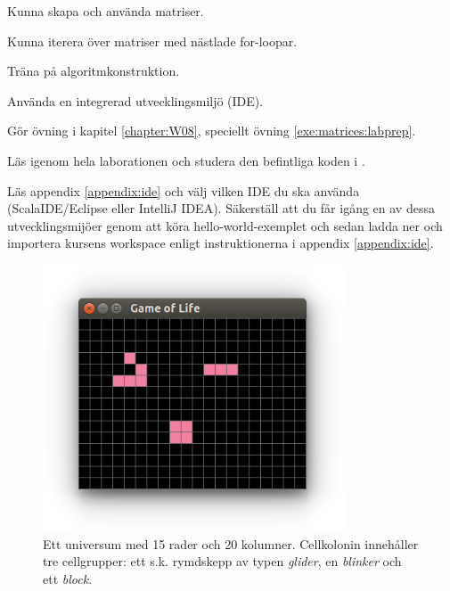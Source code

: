 
\Lab{\LabWeekEIGHT}

\begin{Goals}
\item Kunna skapa och använda matriser.
\item Kunna iterera över matriser med nästlade for-loopar.
\item Träna på algoritmkonstruktion.
\item Använda en integrerad utvecklingsmiljö (IDE).
\end{Goals}

\begin{Preparations}
\item Gör övning {\tt \ExeWeekEIGHT} i kapitel \ref{chapter:W08}, speciellt övning \ref{exe:matrices:labprep}.

\item Läs igenom hela laborationen och studera den befintliga koden i \TODO {}.

\item Läs appendix \ref{appendix:ide} och välj vilken IDE du ska använda (ScalaIDE/Eclipse eller IntelliJ IDEA). Säkerställ att du får igång en av dessa utvecklingsmijöer genom att köra hello-world-exemplet och sedan ladda ner och importera kursens \TODO workspace enligt instruktionerna i appendix \ref{appendix:ide}.
\end{Preparations}


\begin{figure}[H]
  \includegraphics[width=0.8\textwidth]{../img/glider-blinker-block}

  \vspace{-2em}\label{lab:life:glider-blinker-block}\caption{Ett universum med 15 rader och 20 kolumner. Cellkolonin innehåller tre cellgrupper: ett s.k. rymdskepp av typen \emph{glider}, en \emph{blinker} och ett \emph{block}.}
\end{figure}



